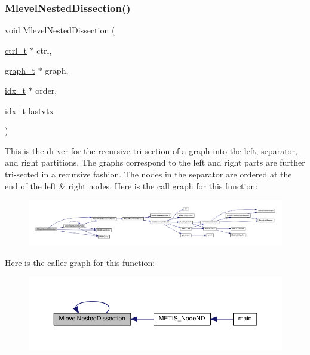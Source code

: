 \subsubsection{\texorpdfstring{Mlevel\+Nested\+Dissection()}{MlevelNestedDissection()}}
{\footnotesize\ttfamily void Mlevel\+Nested\+Dissection (\begin{DoxyParamCaption}\item[{\hyperlink{a00742}{ctrl\+\_\+t} $\ast$}]{ctrl,  }\item[{\hyperlink{a00734}{graph\+\_\+t} $\ast$}]{graph,  }\item[{\hyperlink{a00876_aaa5262be3e700770163401acb0150f52}{idx\+\_\+t} $\ast$}]{order,  }\item[{\hyperlink{a00876_aaa5262be3e700770163401acb0150f52}{idx\+\_\+t}}]{lastvtx }\end{DoxyParamCaption})}

This is the driver for the recursive tri-\/section of a graph into the left, separator, and right partitions. The graphs correspond to the left and right parts are further tri-\/sected in a recursive fashion. The nodes in the separator are ordered at the end of the left \& right nodes. Here is the call graph for this function\+:\nopagebreak
\begin{figure}[H]
\begin{center}
\leavevmode
\includegraphics[width=350pt]{a00945_af853e9d8bbb2188f871fac436e631ed1_cgraph}
\end{center}
\end{figure}
Here is the caller graph for this function\+:\nopagebreak
\begin{figure}[H]
\begin{center}
\leavevmode
\includegraphics[width=350pt]{a00945_af853e9d8bbb2188f871fac436e631ed1_icgraph}
\end{center}
\end{figure}
\mbox{\label{a00945_a3ef15d1ffff55a81b8486bee09239073}} 

